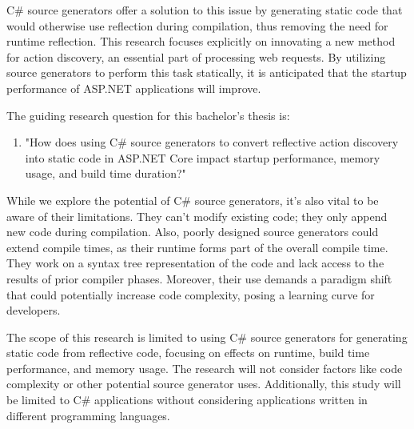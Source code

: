 C\# source generators offer a solution to this issue by generating static code that would otherwise use reflection during compilation, thus removing the need for runtime reflection. This research focuses explicitly on innovating a new method for action discovery, an essential part of processing web requests. By utilizing source generators to perform this task statically, it is anticipated that the startup performance of ASP.NET applications will improve. 

The guiding research question for this bachelor's thesis is:

\begin{enumerate}[label=\textbf{RQ.\arabic*}:, leftmargin=*, labelindent=1em]
    \item "How does using C\# source generators to convert reflective action discovery into static code in ASP.NET Core impact startup performance, memory usage, and build time duration?"
\end{enumerate}

While we explore the potential of C\# source generators, it's also vital to be aware of their limitations. They can't modify existing code; they only append new code during compilation. Also, poorly designed source generators could extend compile times, as their runtime forms part of the overall compile time. They work on a syntax tree representation of the code and lack access to the results of prior compiler phases. Moreover, their use demands a paradigm shift that could potentially increase code complexity, posing a learning curve for developers.

The scope of this research is limited to using C\# source generators for generating static code from reflective code, focusing on effects on runtime, build time performance, and memory usage. The research will not consider factors like code complexity or other potential source generator uses. Additionally, this study will be limited to C\# applications without considering applications written in different programming languages.
